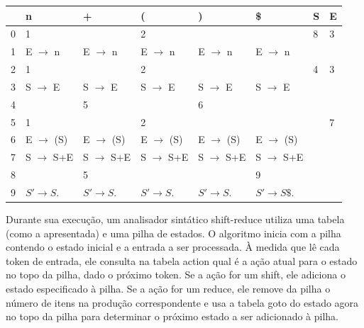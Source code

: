 \begin{table}[H]
  \begin{tabular}{@{}llllllll@{}}
    \toprule
    & n & + & ( & ) & \$ & S & E \\
    \midrule
    0 & 1 & & 2 & & & 8 & 3 \\
    1 & E $\to$ n & E $\to$ n & E $\to$ n & E $\to$ n & E $\to$ n & & \\
    2 & 1 & & 2 & & & 4 & 3 \\
    3 & S $\to$ E & S $\to$ E & S $\to$ E & S $\to$ E & S $\to$ E & & \\
    4 & & 5 & & 6 & & & \\
    5 & 1 & & 2 & & & & 7 \\
    6 & E $\to$ (S) & E $\to$ (S) & E $\to$ (S) & E $\to$ (S) & E
    $\to$ (S) & & \\
    7 & S $\to$ S+E & S $\to$ S+E & S $\to$ S+E & S $\to$ S+E & S
    $\to$ S+E & & \\
    8 & & 5 & & & 9 & & \\
    9 & \(S'\to S\). & \(S' \to S\). & \(S'\to S\). & \(S' \to S\). & \(S'\to
    S\$\). & & \\
    \bottomrule
  \end{tabular}
  \centering
\end{table}

Durante sua execução, um analisador sintático shift-reduce utiliza
uma tabela (como a apresentada) e uma pilha de estados. O algoritmo
inicia com a pilha contendo o estado inicial e a entrada a ser
processada. À medida que lê cada token de entrada, ele consulta na
tabela action qual é a ação atual para o estado no topo da pilha,
dado o próximo token. Se a ação for um shift, ele adiciona o estado
especificado à pilha. Se a ação for um reduce, ele remove da pilha o
número de itens na produção correspondente e usa a tabela goto do
estado agora no topo da pilha para determinar o próximo estado a ser
adicionado à pilha.


